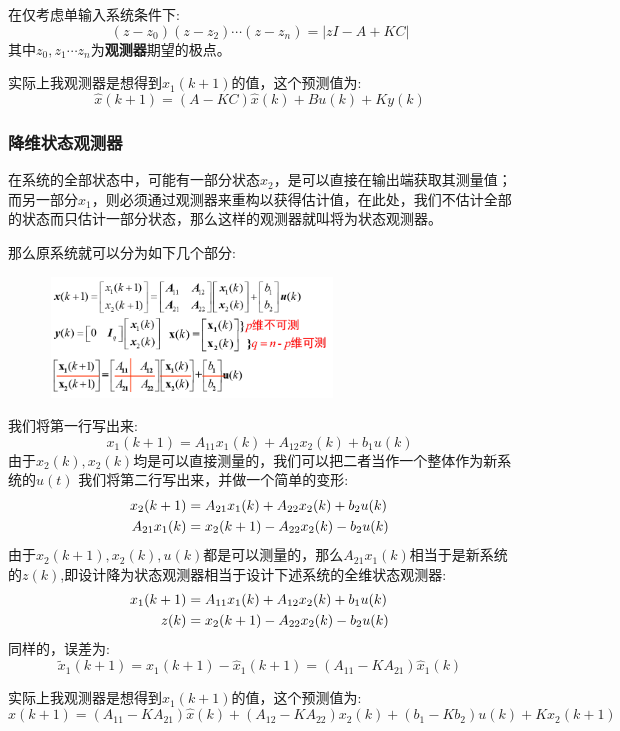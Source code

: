 \documentclass[12pt, a4paper, oneside]{ctexbook}
\begin{document}
在仅考虑单输入系统条件下:
$$
(z-z_0)(z-z_2)\cdots(z-z_n)=|zI-A+KC|
$$
其中$z_0,z_1\cdots z_n$为\textbf{观测器}期望的极点。

实际上我观测器是想得到$\widehat{x}_1(k+1)$的值，这个预测值为:
$$
\widehat{x}(k+1)=(A-KC)\widehat{x}(k)+Bu(k)+Ky(k)
$$
\subsubsection{降维状态观测器}
在系统的全部状态中，可能有一部分状态$x_2$，是可以直接在输出端获取其测量值；而另一部分$x_1$，则必须通过观测器来重构以获得估计值，在此处，我们不估计全部的状态而只估计一部分状态，那么这样的观测器就叫将为状态观测器。

那么原系统就可以分为如下几个部分:
\begin{figure}[htbp]
	\centering
	\includegraphics[width=7.6cm,height=3.2cm]{img/9_2.png}
\end{figure}
我们将第一行写出来:
$$
x_1(k+1)=A_{11}x_1(k)+A_{12}x_2(k)+b_1u(k)
$$
由于$x_2(k),x_2(k)$均是可以直接测量的，我们可以把二者当作一个整体作为新系统的$u(t)$
我们将第二行写出来，并做一个简单的变形:
$$
\begin{aligned}
x_2(k+1)&=A_{21}x_1(k)+A_{22}x_2(k)+b_2u(k)\notag \\
A_{21}x_1(k)&=x_2(k+1)-A_{22}x_2(k)-b_2u(k)\notag
\end{aligned}
$$
由于$x_2(k+1),x_2(k),u(k)$都是可以测量的，那么$A_{21}x_1(k)$相当于是新系统的$z(k)$,即设计降为状态观测器相当于设计下述系统的全维状态观测器:
$$
\begin{aligned}
x_1(k+1)&=A_{11}x_1(k)+A_{12}x_2(k)+b_1u(k)\notag \\
z(k)&=x_2(k+1)-A_{22}x_2(k)-b_2u(k)\notag
\end{aligned}
$$
同样的，误差为:
$$
\widetilde{x}_1(k+1)=x_1(k+1)-\widehat{x}_1(k+1)=(A_{11}-KA_{21})\widehat{x}_1(k)
$$

实际上我观测器是想得到$\widehat{x}_1(k+1)$的值，这个预测值为:
$$
\widehat{x}(k+1)=(A_{11}-KA_{21})\widehat{x}(k)+(A_{12}-KA_{22})x_2(k)+(b_1-Kb_2)u(k)+Kx_2(k+1)
$$
\end{document}
